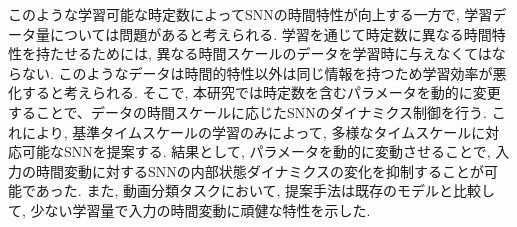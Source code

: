 このような学習可能な時定数によってSNNの時間特性が向上する一方で, 学習データ量については問題があると考えられる.
学習を通じて時定数に異なる時間特性を持たせるためには, 異なる時間スケールのデータを学習時に与えなくてはならない.
このようなデータは時間的特性以外は同じ情報を持つため学習効率が悪化すると考えられる.
そこで, 本研究では時定数を含むパラメータを動的に変更することで、データの時間スケールに応じたSNNのダイナミクス制御を行う.
これにより, 基準タイムスケールの学習のみによって, 多様なタイムスケールに対応可能なSNNを提案する.
結果として, パラメータを動的に変動させることで, 入力の時間変動に対するSNNの内部状態ダイナミクスの変化を抑制することが可能であった.
また, 動画分類タスクにおいて, 提案手法は既存のモデルと比較して, 少ない学習量で入力の時間変動に頑健な特性を示した.

